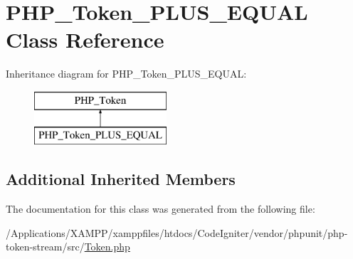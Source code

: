 \hypertarget{class_p_h_p___token___p_l_u_s___e_q_u_a_l}{}\section{P\+H\+P\+\_\+\+Token\+\_\+\+P\+L\+U\+S\+\_\+\+E\+Q\+U\+AL Class Reference}
\label{class_p_h_p___token___p_l_u_s___e_q_u_a_l}
Inheritance diagram for P\+H\+P\+\_\+\+Token\+\_\+\+P\+L\+U\+S\+\_\+\+E\+Q\+U\+AL\+:\begin{figure}[H]
\begin{center}
\leavevmode
\includegraphics[height=2.000000cm]{class_p_h_p___token___p_l_u_s___e_q_u_a_l}
\end{center}
\end{figure}
\subsection*{Additional Inherited Members}


The documentation for this class was generated from the following file\+:\begin{DoxyCompactItemize}
\item 
/\+Applications/\+X\+A\+M\+P\+P/xamppfiles/htdocs/\+Code\+Igniter/vendor/phpunit/php-\/token-\/stream/src/\mbox{\hyperlink{_token_8php}{Token.\+php}}\end{DoxyCompactItemize}
